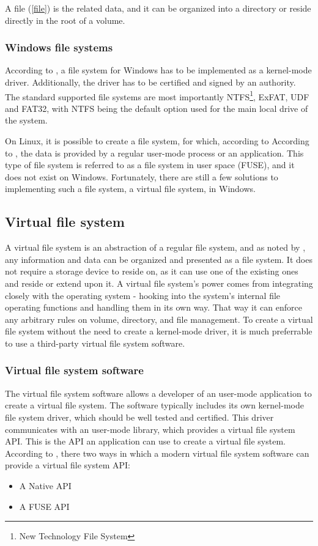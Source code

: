 A file (\ref{file}) is the related data, and it can be organized into a directory or reside directly in the root of a volume.

\subsubsection{Windows file systems}
According to \cite{WinKernelFS}, a file system for Windows has to be implemented as a kernel-mode driver. Additionally, the driver has to be certified and signed by an authority. The standard supported file systems are most importantly NTFS\footnote{New Technology File System}, ExFAT, UDF and FAT32, with NTFS being the default option used for the main local drive of the system.

On Linux, it is possible to create a file system, for which, according to According to \cite{FUSE}, the data is provided by a regular user-mode process or an application. This type of file system is referred to as a file system in user space (FUSE), and it does not exist on Windows. Fortunately, there are still a few solutions to implementing such a file system, a virtual file system, in Windows.

\subsection{Virtual file system}
\label{vfs}
A virtual file system is an abstraction of a regular file system, and as noted by \cite{WinFsp}, any information and data can be organized and presented as a file system. It does not require a storage device to reside on, as it can use one of the existing ones and reside or extend upon it. A virtual file system's power comes from integrating closely with the operating system - hooking into the system's internal file operating functions and handling them in its own way. That way it can enforce any arbitrary rules on volume, directory, and file management. To create a virtual file system without the need to create a kernel-mode driver, it is much preferrable to use a third-party virtual file system software.

\subsubsection{Virtual file system software}
\label{vfsapitypes}
The virtual file system software allows a developer of an user-mode application to create a virtual file system. The software typically includes its own kernel-mode file system driver, which should be well tested and certified. This driver communicates with an user-mode library, which provides a virtual file system API. This is the API an application can use to create a virtual file system. According to \cite{WinFspVSFUSE}, there two ways in which a modern virtual file system software can provide a virtual file system API:
\begin{itemize}
    \item A Native API
    \item A FUSE  API
\end{itemize}


